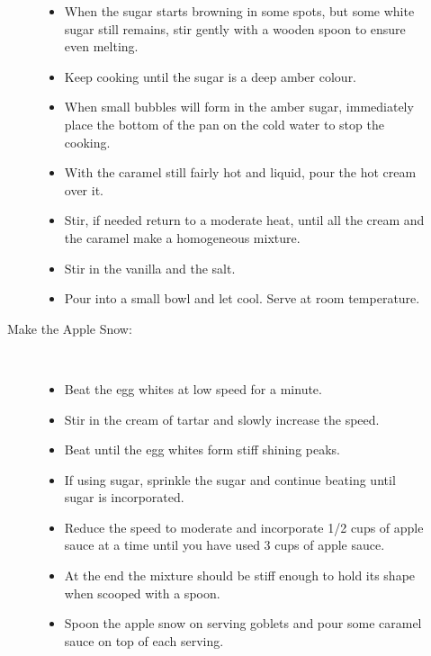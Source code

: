\documentclass [11pt, letterpaper] {article}
\begin{document}
\begin{description}
\begin{description}
\begin{itemize}
			\item When the sugar starts browning in some spots, but some white sugar still remains, stir gently with a wooden spoon to ensure even melting.
			\item Keep cooking until the sugar is a deep amber colour. 
			\item When small bubbles will form in the amber sugar, immediately place the bottom of the pan on the cold water to stop the cooking.
			\item With the caramel still fairly hot and liquid, pour the hot cream over it. 
			\item Stir, if needed return to a moderate heat, until all the cream and the caramel make a homogeneous mixture.
			\item Stir in the vanilla and the salt.
			\item Pour into a small bowl and let cool. Serve at room temperature.
		\end{itemize}
	\item[Make the Apple Snow:]\ \\
		\begin{itemize}
			\item Beat the egg whites at low speed for a minute.
			\item Stir in the cream of tartar and slowly increase the speed.
			\item Beat until the egg whites form stiff shining peaks. 
			\item If using sugar, sprinkle the sugar and continue beating until sugar is incorporated.
			\item Reduce the speed to moderate and incorporate 1/2 cups of apple sauce at a time until you have used 3 cups of apple sauce.
			\item At the end the mixture should be stiff enough to hold its shape when scooped with a spoon.
			\item Spoon the apple snow on serving goblets and pour some caramel sauce on top of each serving.
		\end{itemize}
	\end{description}
\end{description}
\end{document}
